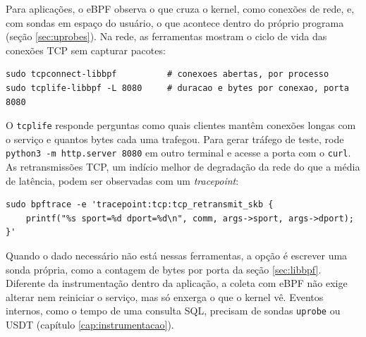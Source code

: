 Para aplicações, o eBPF observa o que cruza o kernel, como conexões de rede, e, com sondas em espaço do usuário, o que acontece dentro do próprio programa (seção \ref{sec:uprobes}). Na rede, as ferramentas mostram o ciclo de vida das conexões TCP sem capturar pacotes:

\begin{lstlisting}
sudo tcpconnect-libbpf          # conexoes abertas, por processo
sudo tcplife-libbpf -L 8080     # duracao e bytes por conexao, porta 8080
\end{lstlisting}

O \texttt{tcplife} responde perguntas como quais clientes mantêm conexões longas com o serviço e quantos bytes cada uma trafegou. Para gerar tráfego de teste, rode \texttt{python3 -m http.server 8080} em outro terminal e acesse a porta com o \texttt{curl}. As retransmissões TCP, um indício melhor de degradação da rede do que a média de latência, podem ser observadas com um \textit{tracepoint}:

\begin{lstlisting}
sudo bpftrace -e 'tracepoint:tcp:tcp_retransmit_skb {
    printf("%s sport=%d dport=%d\n", comm, args->sport, args->dport); }'
\end{lstlisting}

Quando o dado necessário não está nessas ferramentas, a opção é escrever uma sonda própria, como a contagem de bytes por porta da seção \ref{sec:libbpf}. Diferente da instrumentação dentro da aplicação, a coleta com eBPF não exige alterar nem reiniciar o serviço, mas só enxerga o que o kernel vê. Eventos internos, como o tempo de uma consulta SQL, precisam de sondas \texttt{uprobe} ou USDT (capítulo \ref{cap:instrumentacao}).
